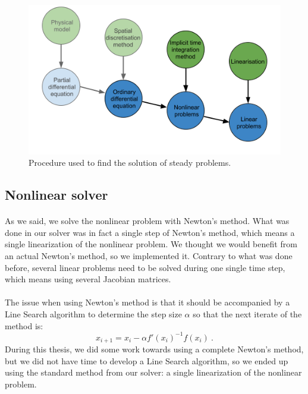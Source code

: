       \begin{figure}
        \centering
        \includegraphics[width=.8\textwidth]{figures/steady_solve.png}
        \caption{Procedure used to find the solution of steady problems.}
        \label{fig:steady_solve}
      \end{figure}


    \subsection{Nonlinear solver}

      \paragraph{}
      As we said, we solve the nonlinear problem with Newton's method.
      What was done in our solver was in fact a single step of Newton's method, which means a single linearization of the nonlinear problem.
      We thought we would benefit from an actual Newton's method, so we implemented it.
      Contrary to what was done before, several linear problems need to be solved during one single time step, which means using several Jacobian matrices.

      \paragraph{}
      The issue when using Newton's method is that it should be accompanied by a Line Search algorithm to determine the step size $\alpha$ so that the next iterate of the method is:
      \begin{equation}
        x_{i+1} = x_i - \alpha f'\left(x_i\right)^{-1} f\left(x_i\right) \ .
      \end{equation}
      During this thesis, we did some work towards using a complete Newton's method, but we did not have time to develop a Line Search algorithm, so we ended up using the standard method from our solver: a single linearization of the nonlinear problem.


